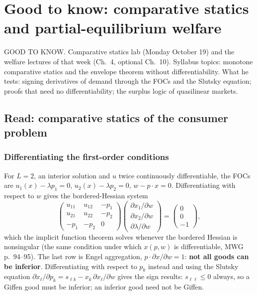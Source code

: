 \documentclass[11pt]{article}
\begin{document}
\clearpage
\appendix\section{Good to know: comparative statics and partial-equilibrium welfare}
\begin{unit}{GOOD TO KNOW. Comparative statics lab (Monday October 19) and the welfare lectures of that week (Ch.~4, optional Ch.~10). Syllabus topics: monotone comparative statics and the envelope theorem without differentiability.}
What he tests: signing derivatives of demand through the FOCs and the Slutsky equation; proofs that need no differentiability; the surplus logic of quasilinear markets.
\end{unit}

\subsection{Read: comparative statics of the consumer problem}\label{sec:cs}
\subsubsection{Differentiating the first-order conditions}
For $L=2$, an interior solution and $u$ twice continuously differentiable, the FOCs are $u_1(x)-\lambda p_1=0$, $u_2(x)-\lambda p_2=0$, $w-p\cdot x=0$. Differentiating with respect to $w$ gives the bordered-Hessian system
\[
\begin{pmatrix}u_{11}&u_{12}&-p_1\\ u_{21}&u_{22}&-p_2\\ -p_1&-p_2&0\end{pmatrix}
\begin{pmatrix}\partial x_1/\partial w\\ \partial x_2/\partial w\\ \partial\lambda/\partial w\end{pmatrix}
=\begin{pmatrix}0\\0\\-1\end{pmatrix},
\]
which the implicit function theorem solves whenever the bordered Hessian is nonsingular (the same condition under which $x(p,w)$ is differentiable, MWG p.~94--95). The last row is Engel aggregation, $p\cdot\partial x/\partial w=1$: \textbf{not all goods can be inferior}. Differentiating with respect to $p_k$ instead and using the Slutsky equation $\partial x_\ell/\partial p_k=s_{\ell k}-x_k\,\partial x_\ell/\partial w$ gives the sign results: $s_{\ell\ell}\le0$ always, so a Giffen good must be inferior; an inferior good need not be Giffen.
\end{document}
